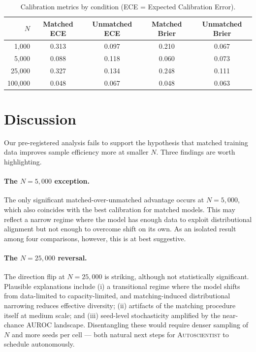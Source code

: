 \documentclass[11pt]{article}
\begin{document}
\begin{table}[h]
\centering
\caption{Calibration metrics by condition (ECE = Expected Calibration Error).}
\label{tab:cal}
\begin{tabular}{rcccc}
\toprule
$N$ & Matched ECE & Unmatched ECE & Matched Brier & Unmatched Brier \\
\midrule
1{,}000   & 0.313 & 0.097 & 0.210 & 0.067 \\
5{,}000   & 0.088 & 0.118 & 0.060 & 0.073 \\
25{,}000  & 0.327 & 0.134 & 0.248 & 0.111 \\
100{,}000 & 0.048 & 0.067 & 0.048 & 0.063 \\
\bottomrule
\end{tabular}
\end{table}

\section{Discussion}

Our pre-registered analysis fails to support the hypothesis that matched training data improves sample efficiency more at smaller $N$. Three findings are worth highlighting.

\paragraph{The $N=5{,}000$ exception.} The only significant matched-over-unmatched advantage occurs at $N=5{,}000$, which also coincides with the best calibration for matched models. This may reflect a narrow regime where the model has enough data to exploit distributional alignment but not enough to overcome shift on its own. As an isolated result among four comparisons, however, this is at best suggestive.

\paragraph{The $N=25{,}000$ reversal.} The direction flip at $N=25{,}000$ is striking, although not statistically significant. Plausible explanations include (i) a transitional regime where the model shifts from data-limited to capacity-limited, and matching-induced distributional narrowing reduces effective diversity; (ii) artifacts of the matching procedure itself at medium scale; and (iii) seed-level stochasticity amplified by the near-chance AUROC landscape. Disentangling these would require denser sampling of $N$ and more seeds per cell --- both natural next steps for \textsc{Autoscientist} to schedule autonomously.
\end{document}
